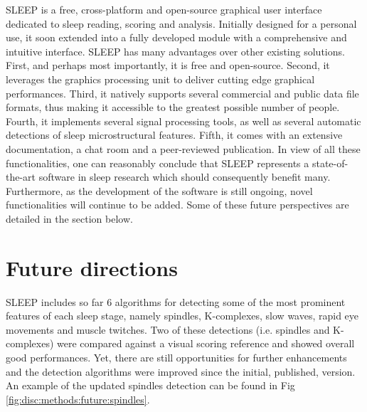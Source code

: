 SLEEP is a free, cross-platform and open-source graphical user interface dedicated to sleep reading, scoring and analysis. Initially designed for a personal use, it soon extended into a fully developed module with a comprehensive and intuitive interface. SLEEP has many advantages over other existing solutions. First, and perhaps most importantly, it is free and open-source. Second, it leverages the graphics processing unit to deliver cutting edge graphical performances. Third, it natively supports several commercial and public data file formats, thus making it accessible to the greatest possible number of people. Fourth, it implements several signal processing tools, as well as several automatic detections of sleep microstructural features. Fifth, it comes with an extensive documentation, a chat room and a peer-reviewed publication. In view of all these functionalities, one can reasonably conclude that SLEEP represents a state-of-the-art software in sleep research which should consequently benefit many. Furthermore, as the development of the software is still ongoing, novel functionalities will continue to be added. Some of these future perspectives are detailed in the section below.

\section{Future directions}
\label{disc:methods:future}

SLEEP includes so far 6 algorithms for detecting some of the most prominent features of each sleep stage, namely spindles, K-complexes, slow waves, rapid eye movements and muscle twitches. Two of these detections (i.e. spindles and K-complexes) were compared against a visual scoring reference and showed overall good performances. Yet, there are still opportunities for further enhancements and the detection algorithms were improved since the initial, published, version. An example of the updated spindles detection can be found in Fig \ref{fig:disc:methods:future:spindles}.

